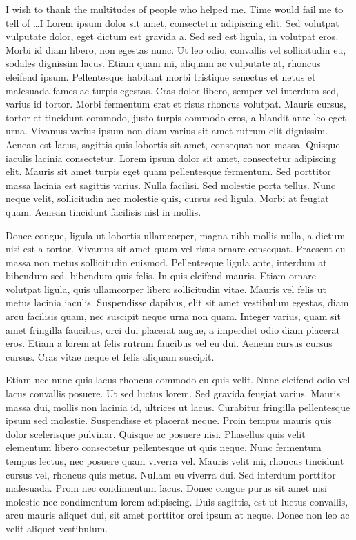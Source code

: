 \documentclass[12pt]{report}	%
\begin{document}
\begin{acknowledgments}		%
  I wish to thank the multitudes of people who helped me. Time would
  fail me to tell of \ldots I Lorem ipsum dolor sit amet, consectetur
  adipiscing elit. Sed volutpat vulputate dolor, eget dictum est gravida
  a. Sed sed est ligula, in volutpat eros. Morbi id diam libero, non
  egestas nunc. Ut leo odio, convallis vel sollicitudin eu, sodales
  dignissim lacus. Etiam quam mi, aliquam ac vulputate at, rhoncus
  eleifend ipsum. Pellentesque habitant morbi tristique senectus et
  netus et malesuada fames ac turpis egestas. Cras dolor libero, semper
  vel interdum sed, varius id tortor. Morbi fermentum erat et risus
  rhoncus volutpat. Mauris cursus, tortor et tincidunt commodo, justo
  turpis commodo eros, a blandit ante leo eget urna. Vivamus varius
  ipsum non diam varius sit amet rutrum elit dignissim. Aenean est
  lacus, sagittis quis lobortis sit amet, consequat non massa. Quisque
  iaculis lacinia consectetur. Lorem ipsum dolor sit amet, consectetur
  adipiscing elit. Mauris sit amet turpis eget quam pellentesque
  fermentum. Sed porttitor massa lacinia est sagittis varius. Nulla
  facilisi. Sed molestie porta tellus. Nunc neque velit, sollicitudin
  nec molestie quis, cursus sed ligula. Morbi at feugiat quam. Aenean
  tincidunt facilisis nisl in mollis.

Donec congue, ligula ut lobortis ullamcorper, magna nibh mollis nulla, a
dictum nisi est a tortor. Vivamus sit amet quam vel risus ornare
consequat. Praesent eu massa non metus sollicitudin
euismod. Pellentesque ligula ante, interdum at bibendum sed, bibendum
quis felis. In quis eleifend mauris. Etiam ornare volutpat ligula, quis
ullamcorper libero sollicitudin vitae. Mauris vel felis ut metus lacinia
iaculis. Suspendisse dapibus, elit sit amet vestibulum egestas, diam
arcu facilisis quam, nec suscipit neque urna non quam. Integer varius,
quam sit amet fringilla faucibus, orci dui placerat augue, a imperdiet
odio diam placerat eros. Etiam a lorem at felis rutrum faucibus vel eu
dui. Aenean cursus cursus cursus. Cras vitae neque et felis aliquam
suscipit.

Etiam nec nunc quis lacus rhoncus commodo eu quis velit. Nunc eleifend
odio vel lacus convallis posuere. Ut sed luctus lorem. Sed gravida
feugiat varius. Mauris massa dui, mollis non lacinia id, ultrices ut
lacus. Curabitur fringilla pellentesque ipsum sed molestie. Suspendisse
et placerat neque. Proin tempus mauris quis dolor scelerisque
pulvinar. Quisque ac posuere nisi. Phasellus quis velit elementum libero
consectetur pellentesque ut quis neque. Nunc fermentum tempus lectus,
nec posuere quam viverra vel. Mauris velit mi, rhoncus tincidunt cursus
vel, rhoncus quis metus. Nullam eu viverra dui. Sed interdum porttitor
malesuada. Proin nec condimentum lacus. Donec congue purus sit amet nisi
molestie nec condimentum lorem adipiscing. Duis sagittis, est ut luctus
convallis, arcu mauris aliquet dui, sit amet porttitor orci ipsum at
neque. Donec non leo ac velit aliquet vestibulum.


\end{acknowledgments}
\end{document}
